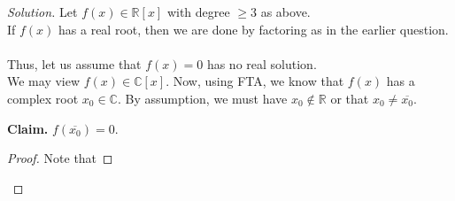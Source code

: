 \documentclass[12pt]{article}
\theoremstyle{definition}
\numberwithin{thm}{section}
\newenvironment{blockquote}
{\begin{mdframed}[skipabove=0pt, skipbelow=0pt, innertopmargin=4pt, innerbottommargin=4pt, bottomline=false,topline=false,rightline=false, linewidth=2pt]}
{\end{mdframed}}
\newenvironment{soln}{\begin{proof}[Solution]}{\end{proof}}
\begin{document}
\begin{enumerate}
	\begin{soln}
		Let $f(x) \in \mathbb{R}[x]$ with degree $\ge 3$ as above.\\
		If $f(x)$ has a real root, then we are done by factoring as in the earlier question.\\~\\
		Thus, let us assume that $f(x) = 0$ has no real solution.\\
		We may view $f(x) \in \mathbb{C}[x].$ Now, using FTA, we know that $f(x)$ has a complex root $x_0 \in \mathbb{C}.$ By assumption, we must have $x_0 \notin \mathbb{R}$ or that $x_0 \neq \overline{x_0}.$ \\
		\begin{blockquote}
			\textbf{Claim.} $f(\overline{x_0}) = 0.$
			\begin{proof} 
				Note that


\end{proof}
\end{blockquote}
\end{soln}
\end{enumerate}
\end{document}
